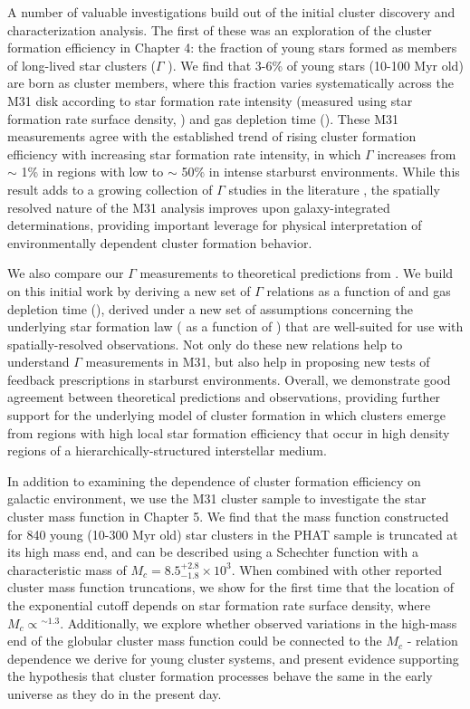 A number of valuable investigations build out of the initial cluster discovery and characterization analysis. The first of these was an exploration of the cluster formation efficiency in Chapter 4: the fraction of young stars formed as members of long-lived star clusters ($\Gamma$ ). We find that 3-6\% of young stars (10-100 Myr old) are born as cluster members, where this fraction varies systematically across the M31 disk according to star formation rate intensity (measured using star formation rate surface density, ) and gas depletion time (). These M31 measurements agree with the established trend of rising cluster formation efficiency with increasing star formation rate intensity, in which $\Gamma$ increases from $\sim$ 1\% in regions with low to $\sim$ 50\% in intense starburst environments. While this result adds to a growing collection of $\Gamma$ studies in the literature , the spatially resolved nature of the M31 analysis improves upon galaxy-integrated determinations, providing important leverage for physical interpretation of environmentally dependent cluster formation behavior.

We also compare our $\Gamma$ measurements to theoretical predictions from . We build on this initial work by deriving a new set of $\Gamma$ relations as a function of and gas depletion time (), derived under a new set of assumptions concerning the underlying star formation law ( as a function of ) that are well-suited for use with spatially-resolved observations. Not only do these new relations help to understand $\Gamma$ measurements in M31, but also help in proposing new tests of feedback prescriptions in starburst environments. Overall, we demonstrate good agreement between theoretical predictions and observations, providing further support for the underlying model of cluster formation in which clusters emerge from regions with high local star formation efficiency that occur in high density regions of a hierarchically-structured interstellar medium.

In addition to examining the dependence of cluster formation efficiency on galactic environment, we use the M31 cluster sample to investigate the star cluster mass function in Chapter 5. We find that the mass function constructed for 840 young (10-300 Myr old) star clusters in the PHAT sample is truncated at its high mass end, and can be described using a Schechter function with a characteristic mass of $M_c = 8.5^{+2.8}_{-1.8} \times 10^3$. When combined with other reported cluster mass function truncations, we show for the first time that the location of the exponential cutoff depends on star formation rate surface density, where $M_c \propto$$^{\sim1.3}$. Additionally, we explore whether observed variations in the high-mass end of the globular cluster mass function could be connected to the $M_c$ - relation dependence we derive for young cluster systems, and present evidence supporting the hypothesis that cluster formation processes behave the same in the early universe as they do in the present day.


